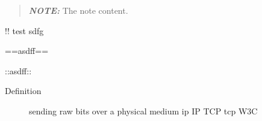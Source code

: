 \begin{quote}
\textbf{\emph{NOTE:}} The note content.
\end{quote}

!! test sdfg

==asdff==

::asdff::

\begin{Shaded}
\begin{Highlighting}[]
\end{Highlighting}
\end{Shaded}

\begin{description}
\item[Definition]
sending raw bits over a physical medium ip IP TCP tcp W3C
\end{description}
